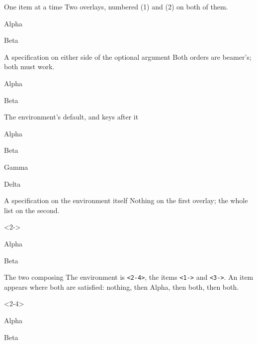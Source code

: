 \documentclass{beamer}
\begin{document}
\begin{frame}{One item at a time}
Two overlays, numbered (1) and (2) on both of them.
\begin{prop}
  \item<1-> Alpha
  \item<2-> Beta
\end{prop}
\end{frame}

\begin{frame}{A specification on either side of the optional argument}
Both orders are beamer's; both must work.
\begin{prop}
  \item<1->[Premise] Alpha
  \item[Conclusion]<2-> Beta
\end{prop}
\end{frame}

\begin{frame}{The environment's default, and keys after it}
\begin{prop}[<+->]
  \item Alpha
  \item Beta
\end{prop}
\begin{prop}[<+->, align=runin]
  \item Gamma
  \item Delta
\end{prop}
\end{frame}

\begin{frame}{A specification on the environment itself}
Nothing on the first overlay; the whole list on the second.
\begin{prop}<2->
  \item Alpha
  \item Beta
\end{prop}
\end{frame}

\begin{frame}{The two composing}
The environment is \texttt{<2-4>}, the items \texttt{<1->} and \texttt{<3->}.
An item appears where both are satisfied: nothing, then Alpha, then both,
then both.
\begin{prop}<2-4>
  \item<1-> Alpha
  \item<3-> Beta
\end{prop}
\end{frame}
\end{document}
